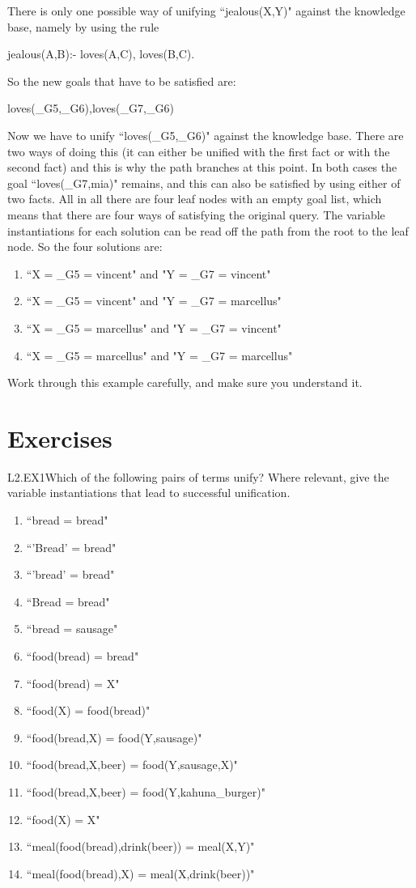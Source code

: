 There is only one possible way of unifying ``jealous(X,Y)" against the
knowledge base, namely by using the rule
\begin{LPNcodedisplay}
jealous(A,B):- loves(A,C), loves(B,C).
\end{LPNcodedisplay}
%
So the new goals that have to be satisfied are:
\begin{LPNcodedisplay}
loves(_G5,_G6),loves(_G7,_G6)
\end{LPNcodedisplay}
Now we have to unify ``loves(\_G5,\_G6)" against the knowledge base.
There are two ways of doing this (it can either be unified with the
first fact or with the second fact) and this is why the path branches
at this point. In both cases the goal ``loves(\_G7,mia)" remains, and
this can also be satisfied by using  either of two facts.  All in
all there are four leaf nodes with an empty goal list, which means
that there are four ways of satisfying the original query. The
variable instantiations for each solution can be read off the path
from the root to the leaf node. So the four solutions are:
\begin{enumerate}
\item{}``X = \_G5 = vincent" and
"Y = \_G7 = vincent"
\item{}``X = \_G5 = vincent" and
"Y = \_G7 = marcellus"
\item{}``X = \_G5 = marcellus" and
"Y = \_G7 = vincent"
\item{}``X = \_G5 = marcellus" and
"Y = \_G7 = marcellus"
\end{enumerate}
Work through this example carefully, and make sure you understand it.

\section{Exercises}\label{SEC.L2.EXERCISES}

\begin{LPNexercise}{L2.EX1}Which of the following pairs of terms unify?
Where relevant, give the
variable instantiations that lead to successful unification.
\begin{enumerate}
\item{}``bread = bread"
\item{}``'Bread' = bread"
\item{}``'bread' = bread"
\item{}``Bread = bread"
\item{}``bread = sausage"
\item{}``food(bread) = bread"
\item{}``food(bread) = X"
\item{}``food(X) = food(bread)"
\item{}``food(bread,X) = food(Y,sausage)"
\item{}``food(bread,X,beer) = food(Y,sausage,X)"
\item{}``food(bread,X,beer) = food(Y,kahuna\_burger)"
\item{}``food(X) = X"
\item{}``meal(food(bread),drink(beer)) = meal(X,Y)"
\item{}``meal(food(bread),X) = meal(X,drink(beer))"
\end{enumerate}
\end{LPNexercise}

